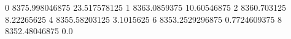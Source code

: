 0 8375.998046875 23.517578125
1 8363.0859375 10.60546875
2 8360.703125 8.22265625
4 8355.58203125 3.1015625
6 8353.2529296875 0.7724609375
8 8352.48046875 0.0
